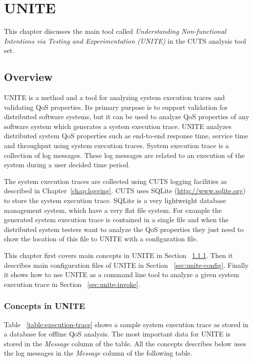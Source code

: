 \chapter{UNITE}
\label{chap:unite}

This chapter discusses the main tool called \textit{Understanding 
Non-functional Intentions via Testing and Experimentation (UNITE)} in the CUTS 
analysis tool set. 

\section{Overview}
\label{sec:unite-overview}

UNITE is a method and a tool for analyzing system execution 
traces and validating QoS properties. Its primary purpose
is to support validation for distributed software systems,
but it can be used to analyze QoS properties of any software
system which generates a system execution trace. 
UNITE analyzes distributed system QoS properties such as 
end-to-end response time, service time and throughput using system 
execution traces. System execution trace is a collection of log messages.
These log messages are related to an execution of the system during a user 
decided time period. 

The system execution traces are collected 
using CUTS logging facilities as described in Chapter~\ref{chap:logging}.
CUTS uses SQLite (\url{http://www.sqlite.org}) 
to store the system execution trace. SQLite is a very lightweight 
database management system, which have a very flat file system. For example 
the generated system execution trace is contained in a single file and when 
the distributed system testers want to analyze the QoS properties they 
just need to show the location of this file to UNITE with a configuration 
file. 

This chapter first covers main concepts in UNITE in Section ~\ref{sec:unite-concepts}. 
Then it describes main configuration files of UNITE in  Section ~\ref{sec:unite-config}. 
Finally it shows how to use UNITE as a command line tool to analyze 
a given system execution trace in Section ~\ref{sec:unite-invoke}.

\subsection{Concepts in UNITE}
\label{sec:unite-concepts}

Table ~\ref{table:execution-trace} shows a sample system execution trace 
as stored in a database for offline QoS analysis. The most important 
data for UNITE is stored in the \textit{Message} column of the table. 
All the concepts describes below uses the log messages in the \textit{Message} 
column of the following table.

